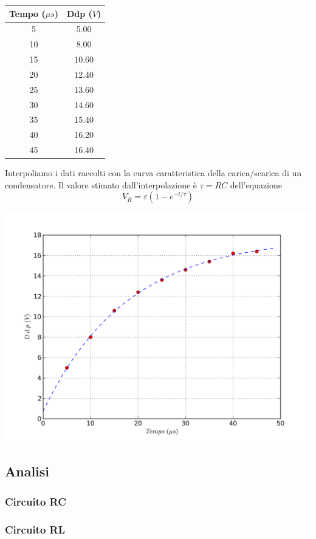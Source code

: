 \begin{center}
\begin{tabular}{*{2}{c}}
Tempo ($\mu s$) & Ddp ($V$) \\
\midrule
5 & 5.00 \\
10 & 8.00 \\
15 & 10.60 \\
20 & 12.40 \\
25 & 13.60 \\
30 & 14.60 \\
35 & 15.40 \\
40 & 16.20 \\
45 & 16.40 \\
\end{tabular}
\end{center}
Interpoliamo i dati raccolti con la curva caratteristica della carica/scarica di un condensatore.
Il valore stimato dall'interpolazione è $\tau=RC$ dell'equazione
$$V_R = \varepsilon \left( 1-e^{-t/\tau} \right)$$

\begin{center}
 \includegraphics[scale=0.70]{grafici/C3/fitindu.png}
\end{center}

\subsection{Analisi}

\subsubsection{Circuito RC}
\subsubsection{Circuito RL}
